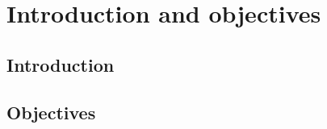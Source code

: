 \documentclass[a4paper,
	10pt
	]{memoir}       %
\begin{document}

\pagestyle{ruled}

\frontmatter

    \maketitle
	
		
		
	~\newpage
	\thispagestyle{empty}	
	~\newpage
		


	\renewcommand*{\contentsname}{Short contents}
	\setcounter{tocdepth}{-1}
	\tableofcontents*	
		
	~\newpage
	\thispagestyle{empty}	
	~\newpage

	\renewcommand{\cftpartafterpnum}{\par\noindent\hrulefill\par}
	\renewcommand*{\contentsname}{Table of contents}
	\setcounter{tocdepth}{2}
	\tableofcontents*	
	
	\newpage
	\listoffigures* 
	
	\newpage
	\listoftables* 


\mainmatter


\part[\textsc{Introduction and objectives}]{Introduction and objectives}

	

\pagestyle{plain}

\chapter*{Introduction}
	\label{chap:introduction}
		

\chapter*{Objectives}
	\label{chap:objectives}
	
\end{document}
